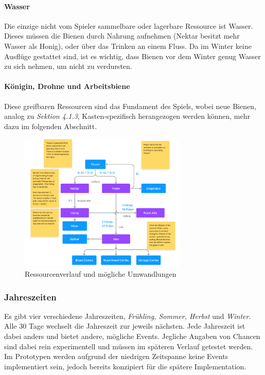 \paragraph{Wasser}
Die einzige nicht vom Spieler sammelbare oder lagerbare Ressource ist Wasser. Dieses müssen die Bienen durch Nahrung aufnehmen (Nektar besitzt mehr Wasser als Honig), oder über das Trinken an einem Fluss. Da im Winter keine Ausflüge gestattet sind, ist es wichtig, dass Bienen vor dem Winter genug Wasser zu sich nehmen, um nicht zu verdursten.

\paragraph{Königin, Drohne und Arbeitsbiene}
Diese greifbaren Ressourcen sind das Fundament des Spiels, wobei neue Bienen, analog zu \textit{Sektion 4.1.3}, Kasten-spezifisch herangezogen werden können, mehr dazu im folgenden Abschnitt.

\begin{figure}
    \begin{center}
        \includegraphics[width=300px]{0.bilder/resourceloop.png}
    \end{center}
    \caption{Ressourcenverlauf und mögliche Umwandlungen} \label{image:resourceloop}
\end{figure}

\subsubsection{Jahreszeiten}
Es gibt vier verschiedene Jahreszeiten, \textit{Frühling, Sommer, Herbst} und \textit{Winter}. Alle 30 Tage wechselt die Jahreszeit zur jeweils nächsten. Jede Jahreszeit ist dabei anders und bietet andere, mögliche Events. Jegliche Angaben von Chancen sind dabei rein experimentell und müssen im späteren Verlauf getestet werden. Im Prototypen werden aufgrund der niedrigen Zeitspanne keine Events implementiert sein, jedoch bereits konzipiert für die spätere Implementation.

